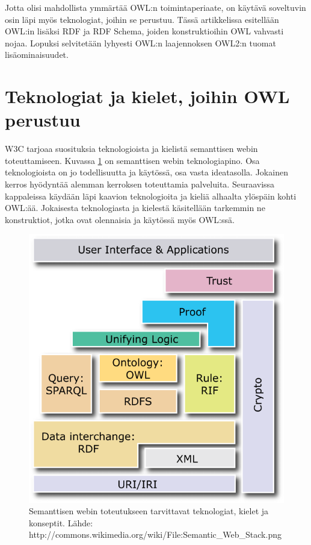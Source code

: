 \documentclass[finnish]{tktltiki2}
\theoremstyle{definition}
\theoremstyle{remark}
\begin{document}
Jotta olisi mahdollista ymmärtää OWL:n toimintaperiaate, on käytävä soveltuvin osin läpi myös teknologiat, joihin
se perustuu. Tässä artikkelissa esitellään OWL:in lisäksi RDF ja RDF Schema, joiden konstruktioihin OWL vahvasti nojaa. 
Lopuksi selvitetään lyhyesti OWL:n laajennoksen OWL2:n tuomat lisäominaisuudet.  

\section{Teknologiat ja kielet, joihin OWL perustuu}
W3C tarjoaa suosituksia teknologioista ja
kielistä  semanttisen webin toteuttamiseen. Kuvassa \ref{stack} on semanttisen webin teknologiapino.
Osa teknologioista on jo todellisuutta ja
käytössä, osa vasta ideatasolla. Jokainen kerros hyödyntää alemman kerroksen toteuttamia
palveluita. Seuraavissa kappaleissa käydään läpi kaavion teknologioita ja kieliä
alhaalta ylöspäin kohti OWL:ää. Jokaisesta teknologiasta ja kielestä käsitellään tarkemmin
ne konstruktiot, jotka ovat olennaisia ja käytössä myös OWL:ssä.

\begin{figure}[h]
 \centering
 \includegraphics[scale=0.50]{stack.png}
 \caption{Semanttisen webin toteutukseen tarvittavat teknologiat, kielet ja konseptit. Lähde: http://commons.wikimedia.org/wiki/File:Semantic\_Web\_Stack.png }
 \label{stack}
\end{figure}
 
\end{document}
